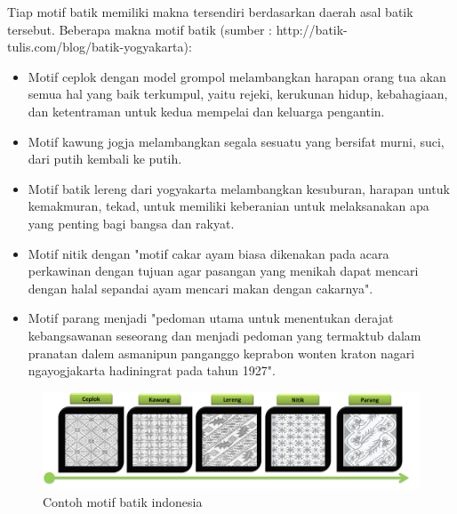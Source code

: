 Tiap motif batik memiliki makna tersendiri berdasarkan daerah asal batik tersebut. Beberapa makna motif batik (sumber : http://batik-tulis.com/blog/batik-yogyakarta):
\begin{itemize}
	\item Motif ceplok dengan model grompol melambangkan harapan orang tua akan semua hal yang baik terkumpul, yaitu rejeki, kerukunan hidup, kebahagiaan, dan ketentraman untuk kedua mempelai dan keluarga pengantin.
	\item Motif kawung jogja melambangkan segala sesuatu yang bersifat murni, suci, dari putih kembali ke putih.
	\item Motif batik lereng dari yogyakarta melambangkan kesuburan, harapan untuk kemakmuran, tekad, untuk memiliki keberanian untuk melaksanakan apa yang penting bagi bangsa dan rakyat.
	\item Motif nitik dengan "motif cakar ayam biasa dikenakan pada acara perkawinan dengan tujuan agar pasangan yang menikah dapat mencari dengan halal sepandai ayam mencari makan dengan cakarnya".
	\item Motif parang menjadi "pedoman utama untuk menentukan derajat kebangsawanan seseorang dan menjadi pedoman yang termaktub dalam pranatan dalem asmanipun panganggo keprabon wonten kraton nagari ngayogjakarta hadiningrat pada tahun 1927".
\end{itemize} 
\begin{figure}[htp]
	\centering
	\includegraphics[width=15cm]{pics/motif_batik}
	\caption{Contoh motif batik indonesia}
	\label{fig:motif_batik}
\end{figure}